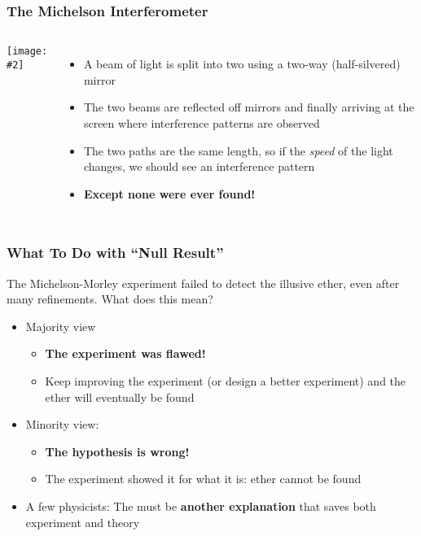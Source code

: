 \documentclass[12pt,compress,aspectratio=169]{beamer}
\newcommand{\pic}[2]{\texttt{[image: \#2]}}
\begin{document}
\begin{frame}
  \frametitle{The Michelson Interferometer}
  \begin{columns}
    \begin{center}
      \pic{1.1}{graphics/313754.jpg}
    \end{center}

    \begin{itemize}
    \item A beam of light is split into two using a two-way (half-silvered)
      mirror
    \item The two beams are reflected off mirrors and finally arriving at the
      screen where interference patterns are observed
    \item The two paths are the same length, so if the \emph{speed} of the light
      changes, we should see an interference pattern
    \item\textbf{Except none were ever found!}
    \end{itemize}
  \end{columns}
\end{frame}



\begin{frame}
  \frametitle{What To Do with ``Null Result''}
  The Michelson-Morley experiment failed to detect the illusive ether, even
  after many refinements. What does this mean?
  \begin{itemize}
  \item Majority view
    \begin{itemize}
    \item\textbf{The experiment was flawed!}
    \item Keep improving the experiment (or design a better experiment) and the
      ether will eventually be found
    \end{itemize}
  \item Minority view:
    \begin{itemize}
    \item\textbf{The hypothesis is wrong!}
    \item The experiment showed it for what it is: ether cannot be found
    \end{itemize}
  \item A few physicists: The must be \textbf{another explanation} that saves
    both experiment and theory
  \end{itemize}
\end{frame}
\end{document}

